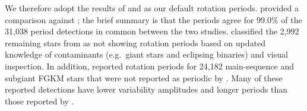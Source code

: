 \documentclass[11pt,twocolumn,tighten]{aastex63}
\begin{document}

We therefore adopt the results of  and
 as our default rotation periods.
 provided a comparison against
; the brief summary is that the periods
agree for 99.0\% of the 31{,}038 period detections in common between
the two studies.   classified the 2{,}992
remaining stars from  as not showing
rotation periods based on updated knowledge of contaminants
(e.g.~giant stars and eclipsing binaries) and visual inspection.  In
addition,  reported rotation periods for
24{,}182 main-sequence and subgiant FGKM stars that were not reported
as periodic by .  Many of these reported
detections have lower variability amplitudes and longer periods than
those reported by . 
\end{document}
